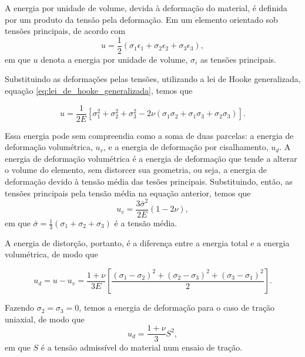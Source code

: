 A energia por unidade de volume, devida à deformação do material, é definida por um produto da tensão pela deformação. Em um elemento orientado sob tensões principais, de acordo com \cite{Hibbeler}
\begin{equation}
    u = \frac{1}{2} (\sigma_1 \epsilon_1 + \sigma_2 \epsilon_2 + \sigma_3 \epsilon_3),
\end{equation}
em que $u$ denota a energia por unidade de volume, $\sigma_i$ as tensões principais.

Substituindo as deformações pelas tensões, utilizando a lei de Hooke generalizada, equação \ref{eq:lei_de_hooke_generalizada}, temos que

\begin{equation}
    u = \frac{1}{2E} \left[ \sigma_1^2 + \sigma_2^2 + \sigma_3^2 - 2\nu(\sigma_1\sigma_2 + \sigma_1\sigma_3 + \sigma_2 \sigma_3) \right].
    \label{eq:energia_deformacao}
\end{equation}

Essa energia pode sem compreendia como a soma de duas parcelas: a energia de deformação volumétrica, $u_v$, e a energia de deformação por cisalhamento, $u_d$. A energia de deformação volumétrica é a energia de deformação que tende a alterar o volume do elemento, sem distorcer sua geometria, ou seja, a energia de deformação devido à tensão média das tesões principais. Substituindo, então, as tensões principais pela tensão média na equação anterior, temos que
\begin{equation}
    u_v = \frac{3\bar{\sigma}^2}{2E} (1 - 2\nu),
    \label{eq:energia_deformacao_volumetrica}
\end{equation}
em que $\bar{\sigma} = \frac{1}{3} (\sigma_1 + \sigma_2 + \sigma_3)$ é a tensão média. 

A energia de distorção, portanto, é a diferença entre a energia total e a energia volumétrica, de modo que

\begin{equation}
    u_d = u - u_v = \frac{1 +\nu}{3E} \left[\frac{(\sigma_1 - \sigma_2)^2 + (\sigma_2 - \sigma_3)^2 + (\sigma_3 - \sigma_1)^2}{2} \right].
    \label{eq:energia_deformacao_distorcao}    
\end{equation}

Fazendo $\sigma_2 = \sigma_3 = 0$, temos a energia de deformação para o caso de tração uniaxial, de modo que
\begin{equation}
    u_d = \frac{1 + \nu}{3}S^2,
\end{equation}
em que $S$ é a tensão admissível do material num ensaio de tração. \cite{Hibbeler}

